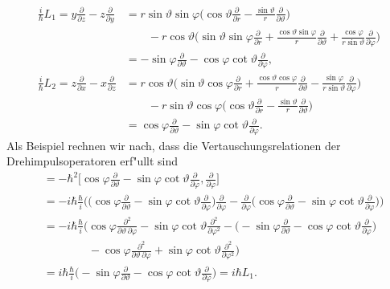 \begin{align*}
\frac{i}{\hbar}L_1
=
y\frac{\partial}{\partial z}-z\frac{\partial}{\partial y}
&=
r\sin\vartheta\sin\varphi
\biggl(
\cos\vartheta
\frac{\partial}{\partial r}
-
\frac{\sin\vartheta}{r}
\frac{\partial}{\partial\vartheta}
\biggr)
\\
&\qquad
-
r\cos\vartheta
\biggl(
\sin\vartheta\sin\varphi
\frac{\partial}{\partial r}
+
\frac{\cos\vartheta\sin\varphi}{r}
\frac{\partial}{\partial\vartheta}
+
\frac{\cos\varphi}{r\sin\vartheta}
\frac{\partial}{\partial\varphi}
\biggr)
\\
&=
-\sin\varphi\frac{\partial}{\partial\vartheta}
-\cos\varphi\cot\vartheta\frac{\partial}{\partial\varphi},
\\
\frac{i}{\hbar}L_2
=
z\frac{\partial}{\partial x}-x\frac{\partial}{\partial z}
&=
r\cos\vartheta
\biggl(
\sin\vartheta\cos\varphi
\frac{\partial}{\partial r}
+
\frac{\cos\vartheta\cos\varphi}{r}
\frac{\partial}{\partial\vartheta}
-
\frac{\sin\varphi}{r\sin\vartheta}
\frac{\partial}{\partial\varphi}
\biggr)
\\
&\qquad
-
r\sin\vartheta\cos\varphi
\biggl(
\cos\vartheta
\frac{\partial}{\partial r}
-
\frac{\sin\vartheta}{r}
\frac{\partial}{\partial\vartheta}
\biggr)
\\
&=
\cos\varphi\frac{\partial}{\partial\vartheta}
-\sin\varphi\cot\vartheta\frac{\partial}{\partial\varphi}.
\end{align*}
Als Beispiel rechnen wir nach, dass die Vertauschungsrelationen der
Drehimpulsoperatoren erf"ullt sind
\begin{align*}
[L_2,L_3]
&=-\hbar^2\biggl[
\cos\varphi\frac{\partial}{\partial\vartheta}
-\sin\varphi\cot\vartheta\frac{\partial}{\partial\varphi}
,\frac{\partial}{\partial\varphi}
\biggr]
\\
&=
-i\hbar\frac{\hbar}{i}\biggl(
\biggl(
\cos\varphi\frac{\partial}{\partial\vartheta}
-\sin\varphi\cot\vartheta\frac{\partial}{\partial\varphi}
\biggr)
\frac{\partial}{\partial\varphi}
-
\frac{\partial}{\partial\varphi}
\biggl(
\cos\varphi\frac{\partial}{\partial\vartheta}
-\sin\varphi\cot\vartheta\frac{\partial}{\partial\varphi}
\biggr)
\biggr)
\\
&=
-i\hbar\frac{\hbar}{i}\biggl(
\cos\varphi\frac{\partial^2}{\partial\vartheta\,\partial\varphi}
-\sin\varphi\cot\vartheta\frac{\partial^2}{\partial\varphi^2}
-
\biggl(
-\sin\varphi\frac{\partial}{\partial\vartheta}
-\cos\varphi\cot\vartheta\frac{\partial}{\partial\varphi}
\biggr)
\\
&\qquad\qquad
-
\cos\varphi\frac{\partial^2}{\partial\vartheta\,\partial\varphi}
+\sin\varphi\cot\vartheta\frac{\partial^2}{\partial\varphi^2}
\biggr)
\\
&=
i\hbar\frac{\hbar}{i}\biggl(
-
\sin\varphi\frac{\partial}{\partial\vartheta}
-
\cos\varphi\cot\vartheta\frac{\partial}{\partial\varphi}
\biggr)
=i\hbar L_1.
\end{align*}

